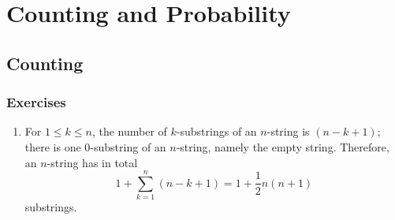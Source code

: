 \setcounter{chapter}{2}
\chapter{Counting and Probability}
\section{Counting}
\subsection*{Exercises}
\begin{enumerate}[\thesection-1]
%
\item For $1 \leq k \leq n$, the number of $k$-substrings of an $n$-string is $(n - k + 1)$; there is one $0$-substring of an $n$-string, namely the empty string. Therefore, an $n$-string has in total
\[
1 + \sum^n_{k = 1} (n - k + 1) = 1 + \frac{1}{2}n(n + 1)
\]
substrings.


\end{enumerate}
